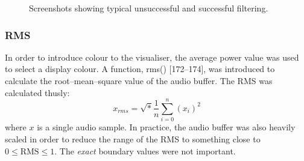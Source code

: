 \documentclass[11pt]{article}
\begin{document}
\begin{figure}[htb]
\centering
{}
\label{fig:filtering}
\caption{Screenshots showing typical unsuccessful   and successful  filtering.}
\end{figure}

\subsubsection{RMS}
\label{sec:rms}
In order to introduce colour to the visualiser, the average power value was used to select a display colour. A function, rms() [172--174], was introduced to calculate the root--mean--square value of the audio buffer. The RMS was calculated thusly:
\begin{equation}
x_{rms} = \sqrt*{\frac{1}{n}\sum_{i=0}^{n} (x_{i})^{2}}
\end{equation}
where $x$ is a single audio sample. In practice, the audio buffer was also heavily scaled in order to reduce the range of the RMS to something close to $0\le \textrm{RMS} \le 1$. The \emph{exact} boundary values were not important.
\end{document}
